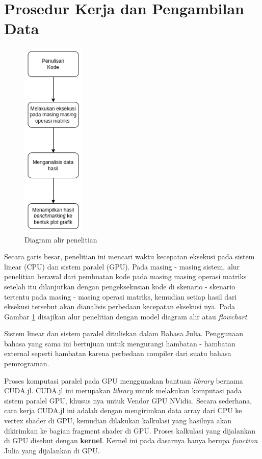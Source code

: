 \section{Prosedur Kerja dan Pengambilan Data}

\begin{figure}[H]
  \centering
  \includegraphics[width=3cm, scale=1]{schema/metode.drawio.png}
  \caption{Diagram alir penelitian}
  \label{img:methods}
\end{figure}

Secara garis besar, penelitian ini mencari waktu kecepatan eksekusi pada sistem
linear (CPU) dan sistem paralel (GPU). Pada masing - masing sistem, alur
penelitian berawal dari pembuatan kode pada masing masing operasi matriks
setelah itu dilanjutkan dengan pengeksekusian kode di skenario - skenario
tertentu pada masing - masing operasi matriks, kemudian setiap hasil dari
eksekusi tersebut akan dianalisis perbedaan kecepatan eksekusi nya. Pada Gambar
\ref{img:methods} disajikan alur penelitian dengan model diagram alir atau
\emph{flowchart}.

Sistem linear dan sistem paralel dituliskan dalam Bahasa Julia. Penggunaan
bahasa yang sama ini bertujuan untuk mengurangi hambatan - hambatan external
seperti hambatan karena perbedaan compiler dari suatu bahasa pemrograman.

Proses komputasi paralel pada GPU menggunakan bantuan \emph{library} bernama
CUDA.jl. CUDA.jl ini merupakan \emph{library} untuk melakukan komputasi pada
sistem paralel GPU, khusus nya untuk Vendor GPU NVidia. Secara sederhana, cara
kerja CUDA.jl ini adalah dengan mengirimkan data array dari CPU ke vertex
shader di GPU, kemudian dilakukan kalkulasi yang hasilnya akan dikirimkan ke
bagian fragment shader di GPU. Proses kalkulasi yang dijalankan di GPU disebut
dengan \textbf{kernel}. Kernel ini pada dasarnya hanya berupa \emph{function}
Julia yang dijalankan di GPU.

